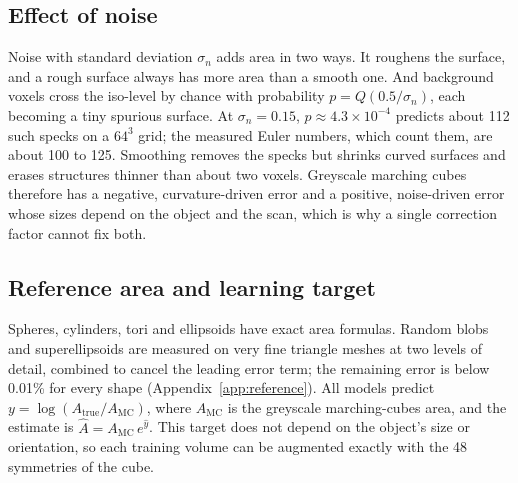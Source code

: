 \subsection{Effect of noise}
Noise with standard deviation $\sigma_n$ adds area in two ways. It roughens the surface, and a rough
surface always has more area than a smooth one. And background voxels cross the iso-level by chance
with probability $p = Q(0.5/\sigma_n)$, each becoming a tiny spurious surface. At $\sigma_n=0.15$,
$p\approx4.3\times10^{-4}$ predicts about 112 such specks on a $64^3$ grid; the measured Euler numbers,
which count them, are about 100 to 125. Smoothing removes the specks but shrinks curved surfaces and
erases structures thinner than about two voxels. Greyscale marching cubes therefore has a negative,
curvature-driven error and a positive, noise-driven error whose sizes depend on the object and the scan,
which is why a single correction factor cannot fix both.

\subsection{Reference area and learning target}
Spheres, cylinders, tori and ellipsoids have exact area formulas. Random blobs and superellipsoids are
measured on very fine triangle meshes at two levels of detail, combined to cancel the leading error
term; the remaining error is below 0.01\% for every shape (Appendix~\ref{app:reference}). All models
predict $y = \log(A_\text{true}/A_\text{MC})$, where $A_\text{MC}$ is the greyscale marching-cubes area,
and the estimate is $\hat A = A_\text{MC}\,e^{\hat y}$. This target does not depend on the object's size
or orientation, so each training volume can be augmented exactly with the 48 symmetries of the cube.
